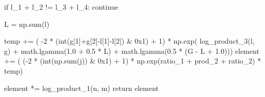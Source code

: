 \begin{python}
                                    if l_1 + l_2 != l_3 + l_4:
                                        continue

                                    L = np.sum(l)

                                    temp += (
                                        -2
                                        * (int(g[1]+g[2]-l[1]-l[2]) & 0x1)
                                        + 1) 
                                        * np.exp(
                                        log_product_3(l, g)
                                        + math.lgamma(1.0 + 0.5 * L)
                                        + math.lgamma(0.5 * (G - L + 1.0)))
                    element += (
                        (-2 * (int(np.sum(j)) & 0x1) + 1)
                        * np.exp(ratio_1 + prod_2 + ratio_2)
                        * temp)

    element *= log_product_1(n, m)
    return element
\end{python}